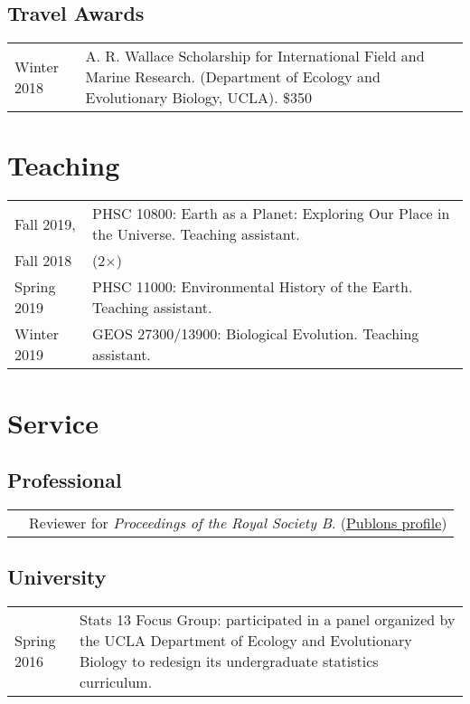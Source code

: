 \documentclass[10pt]{article}
\begin{document}
\subsection*{Travel Awards}

\begin{tabularx}{\textwidth}{>{\raggedleft\arraybackslash}p{2.2cm} X}
Winter 2018 & A. R. Wallace Scholarship for International Field and Marine Research. (Department of Ecology and Evolutionary Biology, UCLA). \$350
\end{tabularx}

\section*{Teaching}

\begin{tabularx}{\textwidth}{>{\raggedleft\arraybackslash}p{2.2cm} X}
Fall 2019, & PHSC 10800: Earth as a Planet: Exploring Our Place in the Universe. Teaching assistant. \\
Fall 2018 & (2$\times$) \\[0.1cm]
Spring 2019 & PHSC 11000: Environmental History of the Earth. Teaching assistant. \\[0.1cm]
Winter 2019 & GEOS 27300/13900: Biological Evolution. Teaching assistant.
\end{tabularx}

\section*{Service}

\subsection*{Professional}

\begin{tabularx}{\textwidth}{>{\raggedleft\arraybackslash}p{2.2cm} X}
2019 & Reviewer for \textit{Proceedings of the Royal Society B}. (\href{https://publons.com/a/3033367}{Publons profile})
\end{tabularx}

\subsection*{University}

\begin{tabularx}{\textwidth}{>{\raggedleft\arraybackslash}p{2.2cm} X}
Spring 2016 & Stats 13 Focus Group: participated in a panel organized by the UCLA Department of Ecology and Evolutionary Biology to redesign its undergraduate statistics curriculum.
\end{tabularx}
\end{document}
